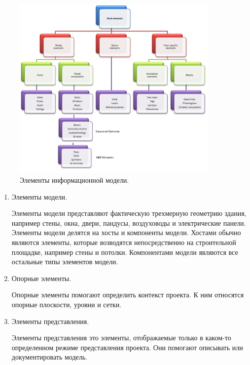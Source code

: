 \begin{figure}[ht]
    \centering
    \includegraphics[width=0.9\textwidth]{images/Revit-elements.png}
    \caption{Элементы информационной модели.%
    \cite{DocRevit}}
    \label{figure:RevitElements}
\end{figure}

\begin{enumerate}
    \item {
        Элементы модели.

        Элементы модели представляют фактическую трехмерную геометрию здания,
        например стены, окна, двери, пандусы,
        воздуховоды и электрические панели.
        Элементы модели делятся на хосты и компоненты модели.
        Хостами обычно являются элементы,
        которые возводятся непосредственно на строительной площадке,
        например стены и потолки.
        Компонентами модели являются все остальные типы элементов модели.
    }
    \item {
        Опорные элементы.

        Опорные элементы помогают определить контекст проекта.
        К ним относятся опорные плоскости, уровни и сетки.
    }
    \item {
        Элементы представления.

        Элементы представления это элементы,
        отображаемые только в каком-то определенном режиме представления проекта.
        Они помогают описывать или документировать модель.
    }
\end{enumerate}

